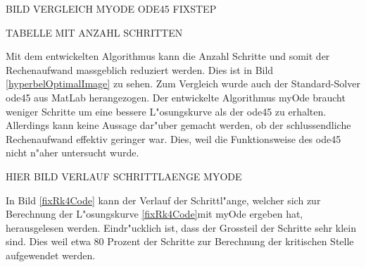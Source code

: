 \begin{refsection}
BILD VERGLEICH MYODE ODE45 FIXSTEP

TABELLE MIT ANZAHL SCHRITTEN

Mit dem entwickelten Algorithmus kann die Anzahl Schritte und somit der Rechenaufwand massgeblich reduziert werden.
Dies ist in Bild \ref{hyperbelOptimalImage} zu sehen.
Zum Vergleich wurde auch der Standard-Solver ode45 aus MatLab herangezogen.
Der entwickelte Algorithmus myOde braucht weniger Schritte um eine bessere L"osungskurve als der ode45 zu erhalten.
Allerdings kann keine Aussage dar"uber gemacht werden, ob der schlussendliche Rechenaufwand effektiv geringer war.
Dies, weil die Funktionsweise des ode45 nicht n"aher untersucht wurde.

HIER BILD VERLAUF SCHRITTLAENGE MYODE

In Bild \ref{fixRk4Code} kann der Verlauf der Schrittl"ange, welcher sich zur Berechnung der L"osungskurve \ref{fixRk4Code}mit myOde ergeben hat, herausgelesen werden.
Eindr"ucklich ist, dass der Grossteil der Schritte sehr klein sind.
Dies weil etwa 80 Prozent der Schritte zur Berechnung der kritischen Stelle aufgewendet werden.

\printbibliography[heading=subbibliography]
\end{refsection}

